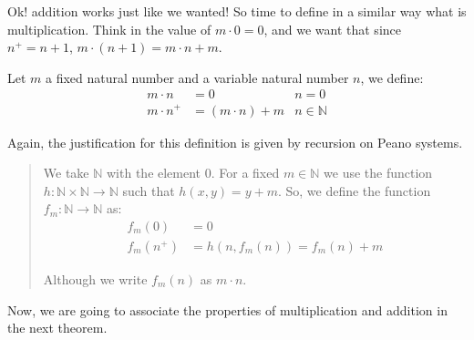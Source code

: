 \documentclass{tufte-handout}
\begin{document}
Ok! addition works just like we wanted! So time to define in a similar way what is multiplication. Think in the value of $m \cdot 0 = 0$, and we want that since $n^+ = n + 1$, $m \cdot (n + 1) = m \cdot n + m$. 

\begin{definition}
	Let $m$ a fixed natural number and a variable natural number $n$, we define:
	\begin{align*}
		m \cdot n &= 0 & n = 0\\
		m \cdot n^+ &= (m \cdot n) + m & n \in \mathbb{N}
	\end{align*}
\end{definition}

Again, the justification for this definition is given by recursion on Peano systems.
\begin{quote}
	We take $\mathbb{N}$ with the element $0$. For a fixed $m \in \mathbb{N}$ we use the function $h: \mathbb{N} \times \mathbb{N} \to \mathbb{N}$ such that $h(x, y) = y + m$. So, we define the function $f_m: \mathbb{N} \to \mathbb{N}$  as:
	\begin{align*}
		f_m(0) &= 0\\
		f_m(n^+) &= h(n, f_m(n)) = f_m(n) + m
	\end{align*}

	Although we write $f_m(n)$ as $m \cdot n$.
\end{quote}

Now, we are going to associate the properties of multiplication and addition in the next theorem.
\end{document}
